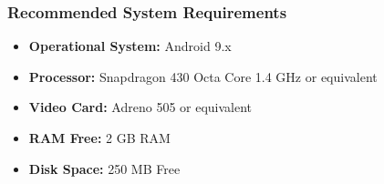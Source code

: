 \subsubsection{Recommended System Requirements}

\begin {itemize}	
	\item \textbf{Operational System:} Android 9.x
	\item \textbf{Processor: } Snapdragon 430 Octa Core 1.4 GHz or equivalent
	\item \textbf{Video Card:}  Adreno 505 or equivalent
	\item \textbf{RAM Free:}  2 GB RAM
	\item \textbf{Disk Space:} 250 MB Free

\end {itemize}


\pagebreak 